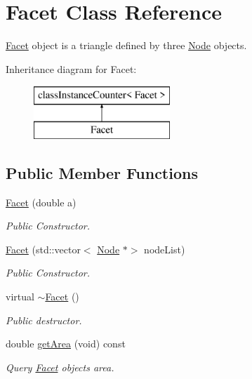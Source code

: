 \hypertarget{class_facet}{}\section{Facet Class Reference}
\label{class_facet}


\mbox{\hyperlink{class_facet}{Facet}} object is a triangle defined by three \mbox{\hyperlink{class_node}{Node}} objects.  


Inheritance diagram for Facet\+:\begin{figure}[H]
\begin{center}
\leavevmode
\includegraphics[height=2.000000cm]{class_facet}
\end{center}
\end{figure}
\subsection*{Public Member Functions}
\begin{DoxyCompactItemize}
\item 
\mbox{\hyperlink{class_facet_acfcdcc63ac32fc2a1d0378a899441bbc}{Facet}} (double a)
\begin{DoxyCompactList}\small\item\em Public Constructor. \end{DoxyCompactList}\item 
\mbox{\hyperlink{class_facet_aaecf4566bbdbfb3904d9c3ce6f7c41cf}{Facet}} (std\+::vector$<$ \mbox{\hyperlink{class_node}{Node}} $\ast$$>$ node\+List)
\begin{DoxyCompactList}\small\item\em Public Constructor. \end{DoxyCompactList}\item 
virtual \mbox{\hyperlink{class_facet_a03f21d37a4b9d63a63a9dc0f76b22d15}{$\sim$\+Facet}} ()
\begin{DoxyCompactList}\small\item\em Public destructor. \end{DoxyCompactList}\item 
double \mbox{\hyperlink{class_facet_a90036d7bb3e52b57ac0d48f6bc1e019c}{get\+Area}} (void) const
\begin{DoxyCompactList}\small\item\em Query \mbox{\hyperlink{class_facet}{Facet}} object\textquotesingle{}s area. \end{DoxyCompactList}\end{DoxyCompactItemize}
